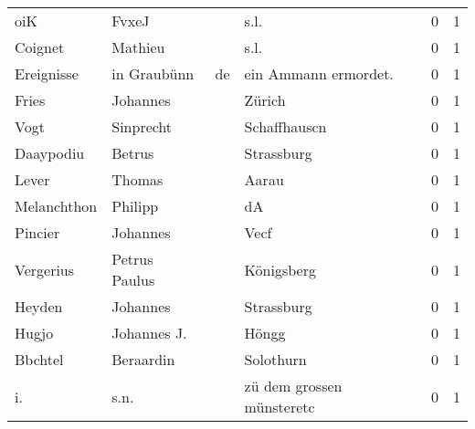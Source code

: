 \begin{tabular}{llllrr}
                      oiK &                              FvxeJ &             &                                        s.l. &          0 &         1 \\
                  Coignet &                            Mathieu &             &                                        s.l. &          0 &         1 \\
               Ereignisse &                        in Graubünn &          de &                       ein Ammann ermordet.  &          0 &         1 \\
                    Fries &                           Johannes &             &                                      Zürich &          0 &         1 \\
                     Vogt &                          Sinprecht &             &                                Schaffhauscn &          0 &         1 \\
                Daaypodiu &                             Betrus &             &                                  Strassburg &          0 &         1 \\
                    Lever &                             Thomas &             &                                       Aarau &          0 &         1 \\
              Melanchthon &                            Philipp &             &                                          dA &          0 &         1 \\
                  Pincier &                           Johannes &             &                                        Vecf &          0 &         1 \\
                Vergerius &                      Petrus Paulus &             &                                  Königsberg &          0 &         1 \\
                   Heyden &                           Johannes &             &                                  Strassburg &          0 &         1 \\
                    Hugjo &                        Johannes J. &             &                                       Höngg &          0 &         1 \\
                  Bbchtel &                          Beraardin &             &                                   Solothurn &          0 &         1 \\
                       i. &                               s.n. &             &                   zü dem grossen münsteretc &          0 &         1 \\

\end{tabular}
